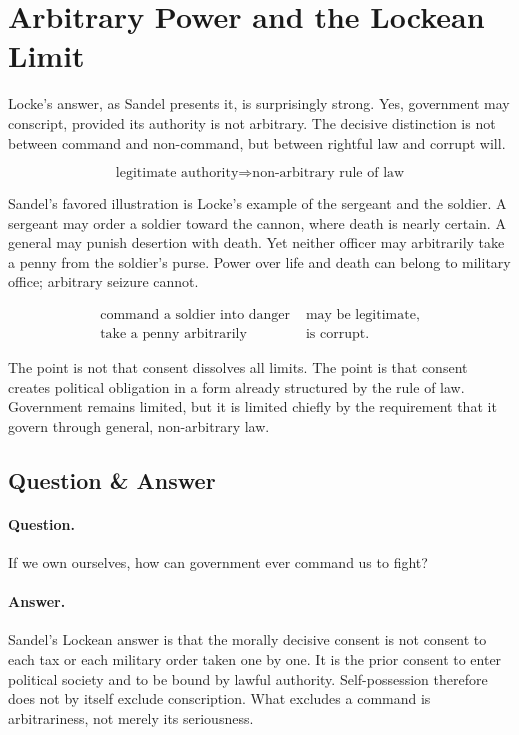 \section{Arbitrary Power and the Lockean Limit}

Locke's answer, as Sandel presents it, is surprisingly strong. Yes, government may conscript, provided its authority is not arbitrary. The decisive distinction is not between command and non-command, but between rightful law and corrupt will.

\begin{equation}
\text{legitimate authority} \Longrightarrow \text{non-arbitrary rule of law}
\end{equation}

Sandel's favored illustration is Locke's example of the sergeant and the soldier. A sergeant may order a soldier toward the cannon, where death is nearly certain. A general may punish desertion with death. Yet neither officer may arbitrarily take a penny from the soldier's purse. Power over life and death can belong to military office; arbitrary seizure cannot.

\begin{align}
\text{command a soldier into danger} &\text{ may be legitimate},\\
\text{take a penny arbitrarily} &\text{ is corrupt.}
\end{align}

The point is not that consent dissolves all limits. The point is that consent creates political obligation in a form already structured by the rule of law. Government remains limited, but it is limited chiefly by the requirement that it govern through general, non-arbitrary law.

\subsection{Question \& Answer}

\paragraph{Question.} If we own ourselves, how can government ever command us to fight?

\paragraph{Answer.} Sandel's Lockean answer is that the morally decisive consent is not consent to each tax or each military order taken one by one. It is the prior consent to enter political society and to be bound by lawful authority. Self-possession therefore does not by itself exclude conscription. What excludes a command is arbitrariness, not merely its seriousness.

